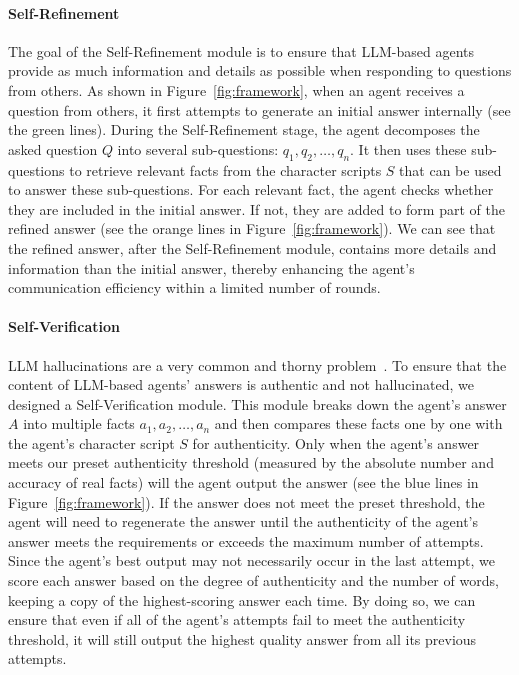 \documentclass[11pt]{article}
\begin{document}
\paragraph{Self-Refinement}
The goal of the Self-Refinement module is to ensure that LLM-based agents provide as much information and details as possible when responding to questions from others. As shown in Figure~\ref{fig:framework}, when an agent receives a question from others, it first attempts to generate an initial answer internally (see the green lines). During the Self-Refinement stage, the agent decomposes the asked question \( Q \) into several sub-questions: \( q_1, q_2, \ldots, q_n \). It then uses these sub-questions to retrieve relevant facts from the character scripts \( S \) that can be used to answer these sub-questions. For each relevant fact, the agent checks whether they are included in the initial answer. If not, they are added to form part of the refined answer (see the orange lines in Figure~\ref{fig:framework}). We can see that the refined answer, after the Self-Refinement module, contains more details and information than the initial answer, thereby enhancing the agent's communication efficiency within a limited number of rounds.

\paragraph{Self-Verification}
LLM hallucinations are a very common and thorny problem~\cite{dhuliawala2023chainofverification}. To ensure that the content of LLM-based agents' answers is authentic and not hallucinated, we designed a Self-Verification module. This module breaks down the agent's answer \( A \) into multiple facts \( a_1, a_2, \ldots, a_n \) and then compares these facts one by one with the agent's character script \( S \) for authenticity. Only when the agent's answer meets our preset authenticity threshold (measured by the absolute number and accuracy of real facts) will the agent output the answer (see the blue lines in Figure~\ref{fig:framework}). If the answer does not meet the preset threshold, the agent will need to regenerate the answer until the authenticity of the agent's answer meets the requirements or exceeds the maximum number of attempts. Since the agent's best output may not necessarily occur in the last attempt, we score each answer based on the degree of authenticity and the number of words, keeping a copy of the highest-scoring answer each time. By doing so, we can ensure that even if all of the agent's attempts fail to meet the authenticity threshold, it will still output the highest quality answer from all its previous attempts.
\end{document}
